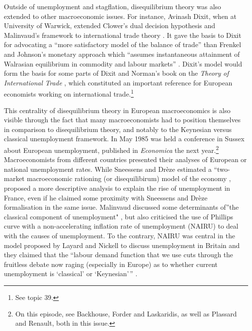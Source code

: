 \documentclass[]{elsarticle} %
\begin{document}
Outside of unemployment and stagflation, disequilibrium theory was also
extended to other macroeconomic issues. For instance, Avinash Dixit,
when at University of Warwick, extended Clower's
\citeyearpar{clower1965} dual decision hypothesis and Malinvaud's
framework to international trade theory \citep[393]{dixit1978}. It gave
the basis to Dixit for advocating a ``more satisfactory model of the
balance of trade'' than Frenkel and Johnson's \citeyearpar{frenkel1976}
monetary approach which ``assumes instantaneous attainment of Walrasian
equilibrium in commodity and labour markets'' \citep[393]{dixit1978}.
Dixit's model would form the basis for some parts of Dixit and Norman's
book on the \emph{Theory of International Trade} \citep{dixit1980},
which constituted an important reference for European economists working
on international trade.\footnote{See topic 39.}

This centrality of disequilibrium theory in European macroeconomics is
also visible through the fact that many macroeconomists had to position
themselves in comparison to disequilibrium theory, and notably to the
Keynesian versus classical unemployment framework. In May 1985 was held
a conference in Sussex about European unemployment, published in
\emph{Economica} the next year.\footnote{On this episode, see Backhouse,
  Forder and Laskaridis, as well as Plassard and Renault, both in this
  issue.} Macroeconomists from different countries presented their
analyses of European or national unemployment rates. While Sneessens and
Drèze estimated a ``two-market macroeconomic rationing (or
disequilibirum) model of the economy \citep[S97]{sneessens1986},
\citet{malinvaud1986} proposed a more descriptive analysis to explain
the rise of unemployment in France, even if he claimed some proximity
with Sneessens and Drèze formalisation in the same issue. Malinvaud
discussed some determinants of''the classical component of unemployment"
\citep[S216]{malinvaud1986}, but also criticised the use of Phillips
curve with a non-accelerating inflation rate of unemployment (NAIRU) to
deal with the causes of unemployment. To the contrary, NAIRU was central
in the model proposed by Layard and Nickell to discuss unemployment in
Britain and they claimed that the ``labour demand function that we use
cuts through the fruitless debate now raging (especially in Europe) as
to whether current unemployment is `classical' or `Keynesian'\,''
\citep[S121]{layard1986}.
\end{document}
